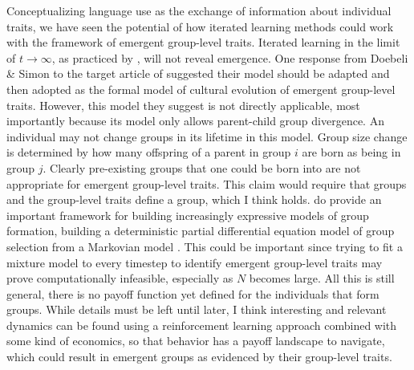 \documentclass[11pt,letterpaper]{article}
\begin{document}
Conceptualizing language use as the exchange of information about individual
traits, we have seen the potential of how iterated learning methods could
work with the framework of emergent group-level traits. Iterated learning
in the limit of $t \to \infty$, as practiced by \cite{Smith2008}, 
will not reveal emergence. One response from Doebeli \& Simon to the target
article of \cite{Smaldino2014} suggested their model \cite{Simon2013} should be adapted and
then adopted as the formal model of cultural evolution of emergent group-level
traits. However, this model they suggest
is not directly applicable, most importantly because its model only allows
parent-child group divergence. An individual may not change groups in its lifetime in
this model. Group size change is determined by how many
offspring of a parent in group $i$ are born as being in group $j$. Clearly 
pre-existing groups that one could be born into are not appropriate for
emergent group-level traits. This claim would require that groups and
the group-level traits define a group, which I think holds.
 do provide an
important framework for building increasingly expressive models of 
group formation, building a deterministic partial differential equation model
of group selection from a Markovian model \cite{Simon2013}. 
This could be important since trying to fit a mixture model to every 
timestep to identify emergent group-level traits may prove computationally
infeasible, especially as $N$ becomes large. All this is still general, there
is no payoff function yet defined for the individuals that form groups. 
While details must be left until later, I think interesting and relevant
dynamics can be found using a reinforcement learning approach \cite{Sutton2016} 
combined with some kind of economics, so that behavior has a payoff landscape to
navigate, which could result in emergent groups as evidenced by their group-level
traits.




\end{document}
